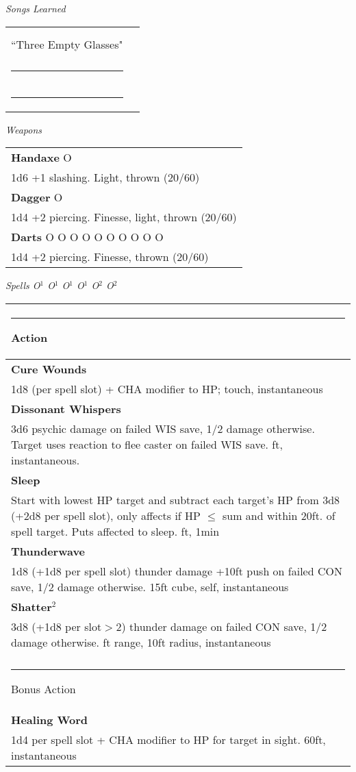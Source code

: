 \documentclass[letterpaper,10pt,twoside,twocolumn,openany]{book}
\begin{document}
{\Large{\textit{Songs Learned}}}\\
\begin{tabular}{|ll|}
\hline&\\
``Three Empty Glasses"&\rule{1.5in}{.2pt}\\
\rule{1.45in}{.2pt}&\rule{1.5in}{.2pt}\\
\rule{1.45in}{.2pt}&\rule{1.5in}{.2pt}\\
\hline
\end{tabular}

\vspace{40pt}

{\Large{\textit{Weapons}}}\\
\begin{tabular}{|m{3.1in}|}
\hline
\textbf{Handaxe} O\\
1d6 +1 slashing. Light, thrown (20/60)\\
\textbf{Dagger} O\\
1d4 +2 piercing. Finesse, light, thrown (20/60)\\
\textbf{Darts} O O O O O O O O O O\\
1d4 +2 piercing. Finesse, thrown (20/60)\\

\hline
\end{tabular}
\vspace{8pt}

{\Large{\textit{Spells \hspace{5em}O$^1$ O$^1$ O$^1$ O$^1$ O$^2$ O$^2$}}}\\
\begin{tabular}{|m{3.1in}|}
\hline
\rule{1.25in}{0pt}Action\\
\hline
\textbf{Cure Wounds}\\
1d8 (per spell slot) + CHA modifier to HP; {\sc touch, instantaneous}\\
\textbf{Dissonant Whispers}\\
3d6 psychic damage on failed WIS save, 1/2 damage otherwise. Target uses reaction to flee caster on failed WIS save.  {\sc 60 ft, instantaneous}.\\
\textbf{Sleep}\\
Start with lowest HP target and subtract each target's HP from 3d8 (+2d8 per spell slot), only affects if HP $\leq$ sum and within 20ft. of spell target. Puts affected to sleep. {\sc 90 ft, 1min}\\
\textbf{Thunderwave}\\
1d8 (+1d8 per spell slot) thunder damage +10ft push on failed CON save, 1/2 damage otherwise. {\sc 15ft cube, self, instantaneous}\\
\textbf{Shatter$^2$}\\
3d8 (+1d8 per slot$>$2) thunder damage on failed CON save, 1/2 damage otherwise. {\sc 60 ft range, 10ft radius, instantaneous}\\
\hline\\
\rule{1.1in}{0pt}Bonus Action\\
\hline
\textbf{Healing Word}\\
1d4 per spell slot + CHA modifier to HP for target in sight. {\sc 60ft, instantaneous}\\
\hline
\end{tabular}
\vspace{8pt}
\end{document}
